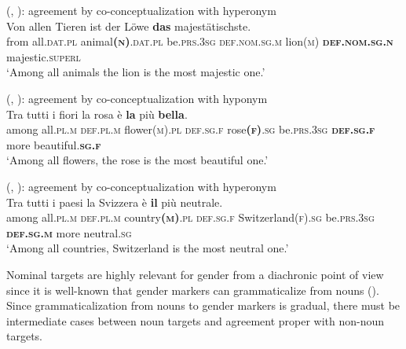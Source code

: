 \documentclass[output=collectionpaper]{langsci/langscibook}
\begin{document}
\ea\label{ex:WDG:66}
 (, ): agreement by co-conceptualization with hyperonym\\
\gll Von	allen	Tieren	ist	der	Löwe	\textbf{das} majestätischste.\\
from	all.\textsc{dat.pl}	animal\textsc{\textbf{(n)}.dat.pl}	be.\textsc{prs.3sg}	\textsc{def.nom.sg.m}	lion(\textsc{m})	\textbf{\textsc{def.nom.sg.n}} majestic.\textsc{superl}\\
\glt `Among all animals the lion is the most majestic one.'\\
\z

%

\ea\label{ex:WDG:68}
 (, ): agreement by co-conceptualization with hyponym\\
\gll Tra	tutti	i	fiori	la	rosa	è	\textbf{la}	più	\textbf{bella}.\\
among	all.\textsc{pl.m}	\textsc{def.pl.m}	flower\textsc{(m).pl}	\textsc{def.sg.f}	rose\textsc{\textbf{(f)}.sg}	be.\textsc{prs.3sg}	\textbf{\textsc{def.sg.f}}	more	beautiful.\textbf{\textsc{sg.f}}\\
\glt `Among all flowers, the rose is the most beautiful one.'\\
\z

\ea\label{ex:WDG:69}
 (, ): agreement by co-conceptualization with hyperonym\\
\gll Tra	tutti	i	paesi	la	Svizzera	è	\textbf{il}	più	neutrale.\\
among	all.\textsc{pl.m}	\textsc{def.pl.m}	country\textsc{\textbf{(m)}.pl}	\textsc{def.sg.f}	Switzerland\textsc{(f).sg}	be.\textsc{prs.3sg}	\textbf{\textsc{def.sg.m}}	more	neutral.\textsc{sg}\\
\glt `Among all countries, Switzerland is the most neutral one.'\\
 \z

 Nominal targets are highly relevant for gender from a diachronic point of view since it is well-known that gender markers can grammaticalize from nouns (\citealt[225]{Heine1984}). Since grammaticalization from nouns to gender markers is gradual, there must be intermediate cases between noun targets and agreement proper with non-noun targets.
\end{document}
